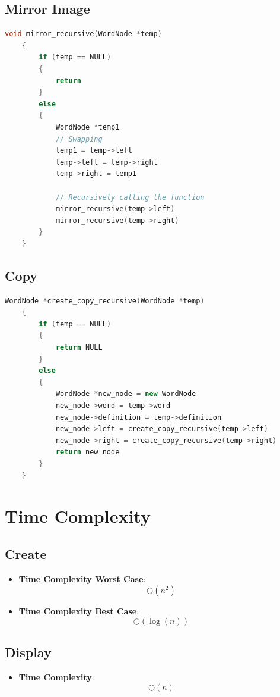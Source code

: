 \documentclass[11pt]{article}
\begin{document}
\subsection{Mirror Image}
\begin{lstlisting}[language=C++]
    void mirror_recursive(WordNode *temp)
    {
        if (temp == NULL)
        {
            return
        }
        else
        {
            WordNode *temp1
            // Swapping
            temp1 = temp->left
            temp->left = temp->right
            temp->right = temp1

            // Recursively calling the function
            mirror_recursive(temp->left)
            mirror_recursive(temp->right)
        }
    }
\end{lstlisting}
\subsection{Copy}
\begin{lstlisting}[language=C++]
    WordNode *create_copy_recursive(WordNode *temp)
    {
        if (temp == NULL)
        {
            return NULL
        }
        else
        {
            WordNode *new_node = new WordNode
            new_node->word = temp->word
            new_node->definition = temp->definition
            new_node->left = create_copy_recursive(temp->left)
            new_node->right = create_copy_recursive(temp->right)
            return new_node
        }
    }
\end{lstlisting}

\section{Time Complexity}
\subsection{Create}
\begin{itemize}
    \item \textbf{Time Complexity Worst Case}: \[\bigcirc(n^2)\]
    \item \textbf{Time Complexity Best Case}: \[\bigcirc(\log(n))\]
\end{itemize}
\subsection{Display}
\begin{itemize}
    \item \textbf{Time Complexity}: \[\bigcirc(n)\]
\end{itemize}
\end{document}
